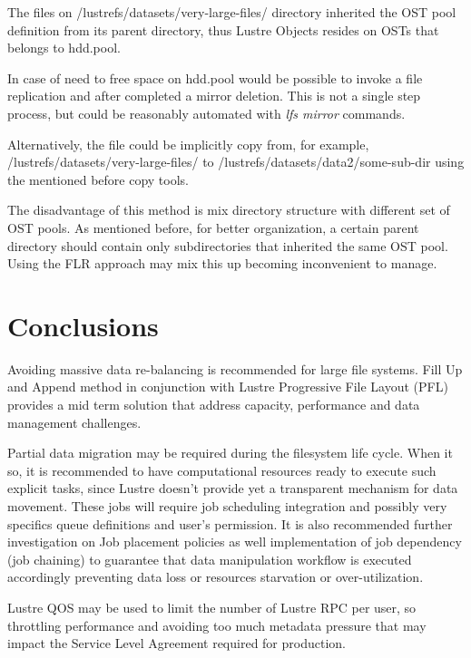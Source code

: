 \documentclass{article}
\begin{document}

The files on /lustrefs/datasets/very-large-files/ directory inherited the OST pool definition from its parent directory, thus Lustre Objects resides on OSTs that belongs to hdd.pool.

In case of need to free space on hdd.pool would be possible to invoke a file replication and after completed a mirror deletion. This is not a single step process, but could be reasonably automated with \textit{lfs mirror} commands.

Alternatively, the file could be implicitly copy from, for example, /lustrefs/datasets/very-large-files/ to /lustrefs/datasets/data2/some-sub-dir using the mentioned before copy tools. 

The disadvantage of this method is mix directory structure with different set of OST pools. As mentioned before, for better organization, a certain parent directory should contain only subdirectories that inherited the same OST pool. Using the FLR approach may mix this up becoming inconvenient to manage. 

\section{Conclusions}
Avoiding massive data re-balancing is recommended for large file systems. Fill Up and Append method in conjunction with Lustre Progressive File Layout (PFL) provides a mid term solution that address capacity, performance and data management challenges.

Partial data migration may be required during the filesystem life cycle. When it so, it is recommended to have computational resources ready to execute such explicit tasks, since Lustre doesn't provide yet a transparent mechanism for data movement. These jobs will require job scheduling integration and possibly very specifics queue definitions and user's permission. It is also recommended further investigation on Job placement policies as well implementation of job dependency (job chaining) to guarantee that data manipulation workflow is executed accordingly preventing data loss or resources starvation or over-utilization. 

Lustre QOS may be used to limit the number of Lustre RPC per user, so throttling performance and avoiding too much metadata pressure that may impact the Service Level Agreement required for production. 
\end{document}
